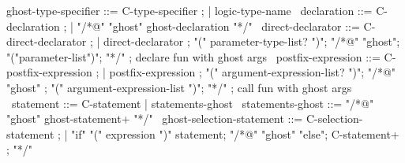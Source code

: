 \begin{syntax}

  ghost-type-specifier ::= C-type-specifier ;
  | {logic-type-name} \
  declaration ::= C-declaration ;
  | "/*@" "ghost" ghost-declaration "*/" \
  direct-declarator ::= C-direct-declarator ;
    | direct-declarator ;
    "(" parameter-type-list? ")";
        {"/*@" "ghost";
          "("parameter-list")";
          "*/"} ; declare fun with ghost args
        \
  postfix-expression ::= C-postfix-expression ;
    | postfix-expression ;
     "(" argument-expression-list? ")";
     {"/*@" "ghost" ;
       "(" argument-expression-list ")";
       "*/"} ; call fun with ghost args
    \
  statement ::= C-statement | statements-ghost \
  statements-ghost ::= "/*@" "ghost" ghost-statement+ "*/" \
  ghost-selection-statement ::= C-selection-statement ;
    | "if" "(" expression ")" statement;
      {"/*@" "ghost" "else";
        C-statement+ ;
        "*/"} \

\end{syntax}

